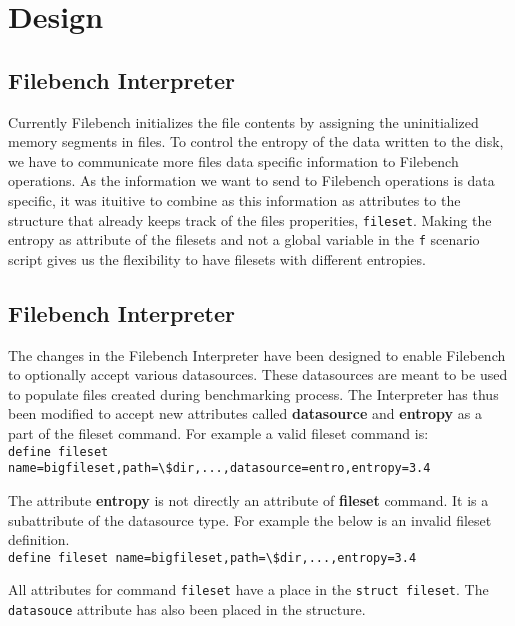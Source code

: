 \chapter{Design}\label{chap:des}

\section{Filebench Interpreter}
\noindent Currently Filebench initializes the file contents by assigning the uninitialized memory segments in files. To control the entropy of the data written to the disk, we have to communicate more files data specific information to Filebench operations.
\newline
\noindent As the information we want to send to Filebench operations is data specific, it was ituitive to combine as this information as attributes to the structure that already keeps track of the files properities, \verb+fileset+.
Making the entropy as attribute of the filesets and not a global variable in the \verb+f+ scenario script gives us the flexibility to have filesets with different entropies.

\section{Filebench Interpreter}
The changes in the Filebench Interpreter have been designed to enable Filebench to optionally accept various datasources. These datasources are meant to be used to populate files created during benchmarking process. The Interpreter has thus been modified to accept new attributes called \textbf{datasource} and \textbf{entropy} as a part of the fileset command. For example a valid fileset command is:\\
\indent \verb+define fileset name=bigfileset,path=\$dir,...,datasource=entro,entropy=3.4+

The attribute \textbf{entropy} is not directly an attribute of \textbf{fileset} command. It is a subattribute of the datasource type. For example the below is an invalid fileset definition.\\
\indent \verb+define fileset name=bigfileset,path=\$dir,...,entropy=3.4+

\noindent All attributes for command \verb+fileset+ have a place in the \verb+struct fileset+. The \verb+datasouce+ attribute has also been placed in the structure.

